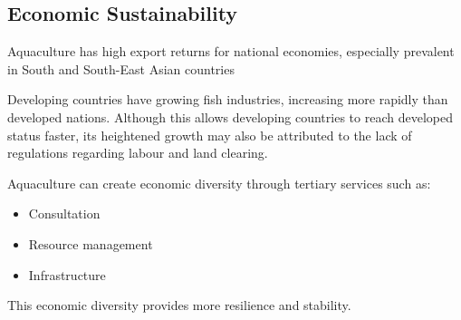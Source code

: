 	\subsection{Economic Sustainability}
		Aquaculture has high export returns for national economies, especially prevalent in South and South-East Asian countries

		Developing countries have growing fish industries, increasing more rapidly than developed nations. Although this allows developing countries to reach developed status faster, its heightened growth may also be attributed to the lack of regulations regarding labour and land clearing.

		Aquaculture can create economic diversity through tertiary services such as:
		\begin{itemize}
			\item Consultation
			\item Resource management
			\item Infrastructure
		\end{itemize}
		This economic diversity provides more resilience and stability.